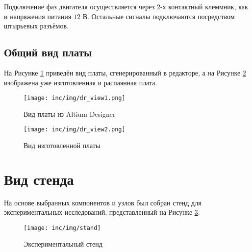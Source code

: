 Подключение фаз двигателя осуществляется через 2-х контактный клеммник, как и напряжения питания $12$ В. Остальные сигналы подключаются посредством штырьевых разъёмов.

\subsection{Общий вид платы}

На Рисунке \ref{pic:dr_view1} приведён вид платы, сгенерированный в редакторе, а на Рисунке \ref{pic:dr_view2} изображена уже изготовленная и распаянная плата.

\begin{figure}[!h]
\centering
\texttt{[image: inc/img/dr\_view1.png]}
\caption{Вид платы из Altium Designer}
\label{pic:dr_view1}
\end{figure}

\begin{figure}[!h]
\centering
\texttt{[image: inc/img/dr\_view2.png]}
\caption{Вид изготовленной платы}
\label{pic:dr_view2}
\end{figure}
\clearpage
\section{Вид стенда}

На основе выбранных компонентов и узлов был собран стенд для экспериментальных исследований, представленный на Рисунке \ref{pic:stand}.

\begin{figure}[!h]
\centering
\texttt{[image: inc/img/stand]}
\caption{Экспериментальный стенд}
\label{pic:stand}
\end{figure}